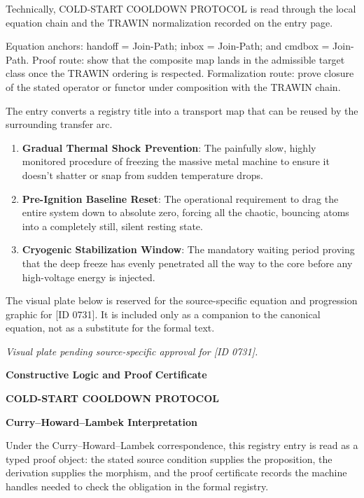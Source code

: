 Technically, COLD-START COOLDOWN PROTOCOL is read through the local equation chain and the TRAWIN normalization recorded on the entry page.

Equation anchors: handoff = Join-Path; inbox = Join-Path; and cmdbox = Join-Path. Proof route: show that the composite map lands in the admissible target class once the TRAWIN ordering is respected. Formalization route: prove closure of the stated operator or functor under composition with the TRAWIN chain.

The entry converts a registry title into a transport map that can be reused by the surrounding transfer arc.
\endgroup

\begin{enumerate}[leftmargin=1.6em,itemsep=6pt,topsep=4pt]
\item \textbf{Gradual Thermal Shock Prevention}: The painfully slow, highly monitored procedure of freezing the massive metal machine to ensure it doesn't shatter or snap from sudden temperature drops.
\item \textbf{Pre-Ignition Baseline Reset}: The operational requirement to drag the entire system down to absolute zero, forcing all the chaotic, bouncing atoms into a completely still, silent resting state.
\item \textbf{Cryogenic Stabilization Window}: The mandatory waiting period proving that the deep freeze has evenly penetrated all the way to the core before any high-voltage energy is injected.
\end{enumerate}

\begingroup\footnotesize\sloppy
The visual plate below is reserved for the source-specific equation and progression graphic for [ID 0731]. It is included only as a companion to the canonical equation, not as a substitute for the formal text.
\par\endgroup
\begingroup\footnotesize\itshape
Visual plate pending source-specific approval for [ID 0731].
\par\endgroup

\clearpage
\begingroup\tzpsupportsetup
\noindent\textbf{\fontsize{10.8pt}{12.8pt}\selectfont [ID 0731] Constructive Logic and Proof Certificate}\par
\noindent\textbf{\fontsize{10pt}{12pt}\selectfont COLD-START COOLDOWN PROTOCOL}\par
\vspace{0.45em}
\begingroup
\footnotesize
\setlength{\parskip}{0.22em}
\setlength{\parindent}{0pt}
\noindent\textbf{Curry--Howard--Lambek Interpretation}\par
Under the Curry--Howard--Lambek correspondence, this registry entry is read as a typed proof
object: the stated source condition supplies the proposition, the derivation supplies the
morphism, and the proof certificate records the machine handles needed to check the obligation
in the formal registry.

